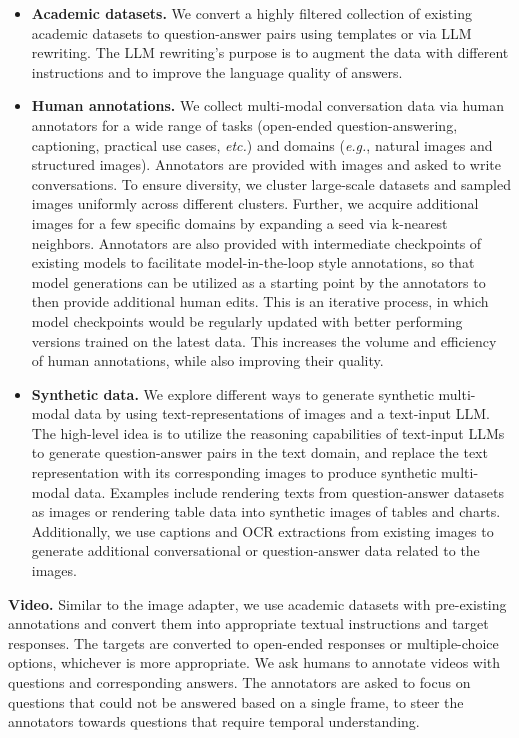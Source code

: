 \begin{itemize}
\item \textbf{Academic datasets.} We convert a highly filtered collection of existing academic datasets to question-answer pairs using templates or via LLM rewriting. The LLM rewriting's purpose is to augment the data with different instructions and to improve the language quality of answers.

\item \textbf{Human annotations.} We collect multi-modal conversation data via human annotators for a wide range of tasks (open-ended question-answering, captioning, practical use cases, \textit{etc.}) and domains (\textit{e.g.}, natural images and structured images). Annotators are provided with images and asked to write conversations. To ensure diversity, we cluster large-scale datasets and sampled images uniformly across different clusters. Further, we acquire additional images for a few specific domains by expanding a seed via k-nearest neighbors. Annotators are also provided with intermediate checkpoints of existing models to facilitate model-in-the-loop style annotations, so that model generations can be utilized as a starting point by the annotators to then provide additional human edits. This is an iterative process, in which model checkpoints would be regularly updated with better performing versions trained on the latest data. This increases the volume and efficiency of human annotations, while also improving their quality.

\item \textbf{Synthetic data.} We explore different ways to generate synthetic multi-modal data by using text-representations of images and a text-input LLM. The high-level idea is to utilize the reasoning capabilities of text-input LLMs to generate question-answer pairs in the text domain, and replace the text representation with its corresponding images to produce synthetic multi-modal data. Examples include rendering texts from question-answer datasets as images or rendering table data into synthetic images of tables and charts. Additionally, we use captions and OCR extractions from existing images to generate additional conversational or question-answer data related to the images.
\end{itemize}

\textbf{Video.} Similar to the image adapter, we use academic datasets with pre-existing annotations and convert them into appropriate textual instructions and target responses. The targets are converted to open-ended responses or multiple-choice options, whichever is more appropriate. We ask humans to annotate videos with questions and corresponding answers. The annotators are asked to focus on questions that could not be answered based on a single frame, to steer the annotators towards questions that require temporal understanding.

